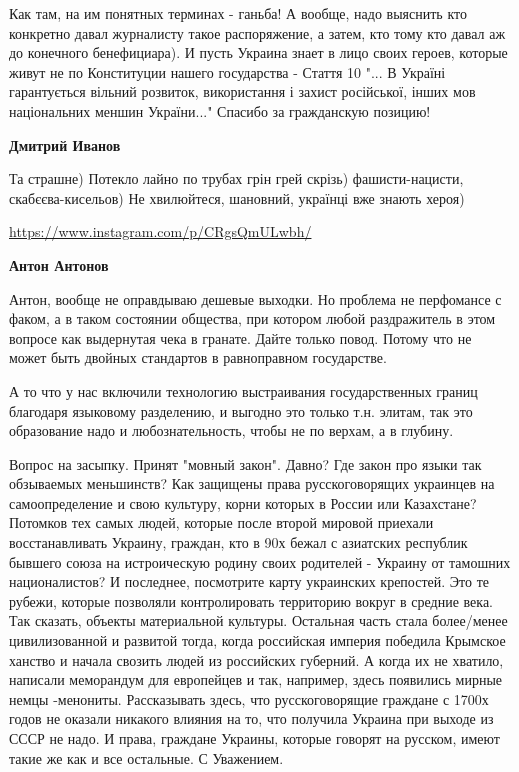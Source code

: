 \begin{itemize}
Как там, на им понятных терминах - ганьба! А вообще, надо выяснить кто
конкретно давал журналисту такое распоряжение, а затем, кто тому кто давал аж
до конечного бенефициара). И пусть Украина знает в лицо своих героев, которые
живут не по Конституции нашего государства - Стаття 10 "... В Україні
гарантується вільний розвиток, використання і захист російської, інших мов
національних меншин України..." Спасибо за гражданскую позицию!

\begin{itemize}

 
\textbf{Дмитрий Иванов} 

Та страшне) Потекло лайно по трубах грін грей скрізь) фашисти-нацисти,
скабєєва-кисельов) Не хвилюйтеся, шановний, українці вже знають хероя)

\url{https://www.instagram.com/p/CRgsQmULwbh/}

 
\textbf{Антон Антонов} 

Антон, вообще не оправдываю дешевые выходки. Но проблема не перфомансе с факом,
а в таком состоянии общества, при котором любой раздражитель в этом вопросе как
выдернутая чека в гранате. Дайте только повод. Потому что не может быть двойных
стандартов в равноправном государстве. 

А то что у нас включили технологию
выстраивания государственных границ благодаря языковому разделению, и выгодно
это только т.н. элитам, так это образование надо и любознательность, чтобы не
по верхам, а в глубину. 

Вопрос на засыпку. Принят "мовный закон". Давно? Где
закон про языки так обзываемых меньшинств? Как защищены права русскоговорящих
украинцев на самоопределение и свою культуру, корни которых в России или
Казахстане? Потомков тех самых людей, которые после второй мировой приехали
восстанавливать Украину, граждан, кто в 90х бежал с азиатских республик бывшего
союза на истроическую родину своих родителей - Украину от тамошних
националистов? И последнее, посмотрите карту украинских крепостей. Это те
рубежи, которые позволяли контролировать территорию вокруг в средние века. Так
сказать, объекты материальной культуры. Остальная часть стала более/менее
цивилизованной и развитой тогда, когда российская империя победила Крымское
ханство и начала свозить людей из российских губерний. А когда их не хватило,
написали меморандум для европейцев и так, например, здесь появились мирные
немцы -менониты. Рассказывать здесь, что русскоговорящие граждане с 1700х годов
не оказали никакого влияния на то, что получила Украина при выходе из СССР не
надо. И права, граждане Украины, которые говорят на русском, имеют такие же как
и все остальные. С Уважением.



\end{itemize}
\end{itemize}
